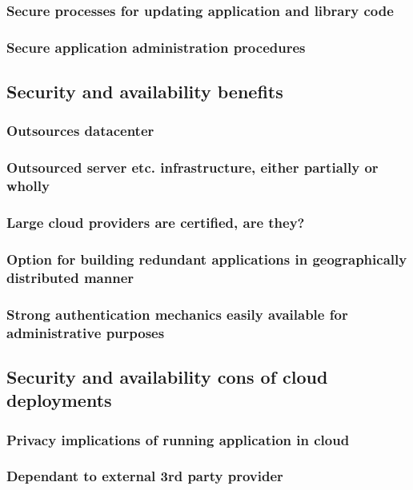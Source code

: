 \documentclass{article}
\begin{document}
\subsubsection{Secure processes for updating application and library code}
\blindtext[2]
\subsubsection{Secure application administration procedures}
\blindtext[2]
\subsection{Security and availability benefits}
\blindtext[2]
\subsubsection{Outsources datacenter}
\blindtext[2]
\subsubsection{Outsourced server etc. infrastructure, either partially or wholly}
\blindtext[2]
\subsubsection{Large cloud providers are certified, are they?}
\blindtext[2]
\subsubsection{Option for building redundant applications in geographically distributed manner}
\blindtext[2]
\subsubsection{Strong authentication mechanics easily available for administrative purposes}
\blindtext[2]
\subsection{Security and availability cons of cloud deployments}
\blindtext[2]
\subsubsection{Privacy implications of running application in cloud}
\blindtext[2]
\subsubsection{Dependant to external 3rd party provider}
\blindtext[2]
\end{document}
